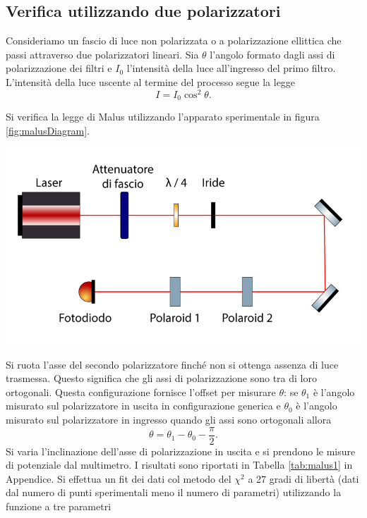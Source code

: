 \documentclass[10pt,oneside,a4paper]{article}
\newenvironment{Figure}
  {\par\medskip\noindent\minipage{\linewidth}}
  {\endminipage\par\medskip}
\begin{document}
\begin{multicols}{2}
\subsection{Verifica utilizzando due polarizzatori}

Consideriamo un fascio di luce non polarizzata o a polarizzazione ellittica che passi attraverso due polarizzatori lineari. Sia $\theta$ l'angolo formato dagli assi di polarizzazione dei filtri e $I_0$ l'intensità della luce all'ingresso del primo filtro. L'intensità della luce uscente al termine del processo segue la legge
\begin{equation}\label{eq:Malus1}
  I = I_0\cos^2\theta.
\end{equation}

Si verifica la legge di Malus utilizzando l'apparato sperimentale in figura \ref{fig:malusDiagram}. 
\begin{Figure}
	\begin{center}
	\includegraphics[width=\linewidth]{malus1Diagram.png}
	\label{fig:malusDiagram}
	\end{center}
\end{Figure}
Si ruota l'asse del secondo polarizzatore finché non si ottenga assenza di luce trasmessa. Questo significa che gli assi di polarizzazione sono tra di loro ortogonali. Questa configurazione fornisce l'offset per misurare $\theta$: se $\theta_1$ è l'angolo misurato sul polarizzatore in uscita in configurazione generica e $\theta_0$ è l'angolo misurato sul polarizzatore in ingresso quando gli assi sono ortogonali allora
\[
\theta = \theta_1 - \theta_0 - \frac{\pi}{2}.
\]
Si varia l'inclinazione dell'asse di polarizzazione in uscita e si prendono le misure di potenziale dal multimetro. I risultati sono riportati in Tabella \ref{tab:malus1} in Appendice. Si effettua un fit dei dati col metodo del $\chi^2$ a 27 gradi di libertà (dati dal numero di punti sperimentali meno il numero di parametri) utilizzando la funzione a tre parametri

\end{multicols}
\end{document}
